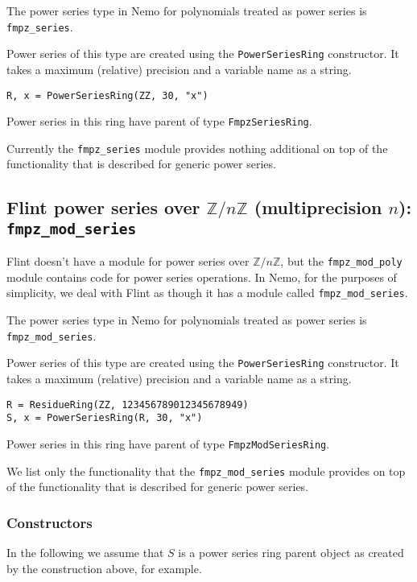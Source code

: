 \documentclass[a4paper,10pt]{article}
\newcommand{\Z}{\mathbb{Z}}
\newcommand{\code}{\lstinline}
\begin{document}
{{The power series type in Nemo for polynomials treated as power series is
\code{fmpz_series}. 

Power series of this type are created using the \code{PowerSeriesRing} constructor.
It takes a maximum (relative) precision and a variable name as a string.

\begin{lstlisting}
R, x = PowerSeriesRing(ZZ, 30, "x")
\end{lstlisting}

Power series in this ring have parent of type \code{FmpzSeriesRing}.

Currently the \code{fmpz_series} module provides nothing additional on top of
the functionality that is described for generic power series.

\subsection{Flint power series over $\Z/n\Z$ (multiprecision $n$): \code{fmpz_mod_series}}

Flint doesn't have a module for power series over $\Z/n\Z$, but the \code{fmpz_mod_poly}
module contains code for power series operations. In Nemo, for the purposes of
simplicity, we deal with Flint as though it has a module called \code{fmpz_mod_series}.

The power series type in Nemo for polynomials treated as power series is
\code{fmpz_mod_series}. 

Power series of this type are created using the \code{PowerSeriesRing} constructor.
It takes a maximum (relative) precision and a variable name as a string.

\begin{lstlisting}
R = ResidueRing(ZZ, 123456789012345678949)
S, x = PowerSeriesRing(R, 30, "x")
\end{lstlisting}

Power series in this ring have parent of type \code{FmpzModSeriesRing}.

We list only the functionality that the \code{fmpz_mod_series} module provides on top of
the functionality that is described for generic power series.

\subsubsection{Constructors}

In the following we assume that $S$ is a power series ring parent object as created
by the construction above, for example.

}}
\end{document}
